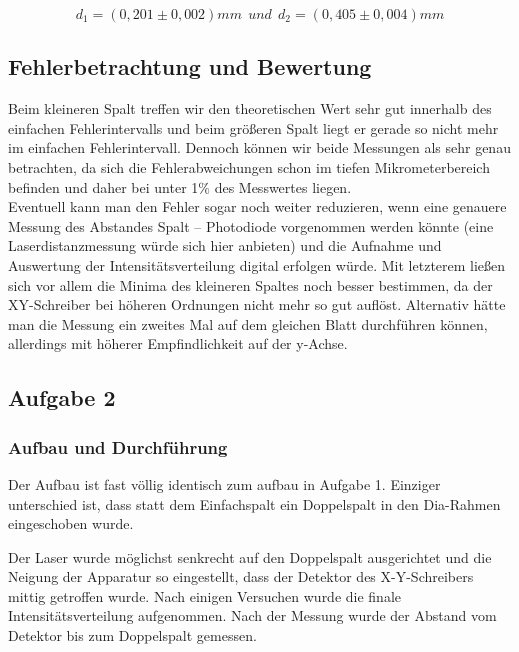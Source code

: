 \documentclass{article}
\begin{document}
\begin{center}
\begin{equation}
d_{1}= (0,201 \pm 0,002)mm \ \ und \ \ d_{2}= (0,405 \pm 0,004)mm
\end{equation}
\end{center}

\subsection{Fehlerbetrachtung und Bewertung}

Beim kleineren Spalt treffen wir den theoretischen Wert sehr gut innerhalb des einfachen Fehlerintervalls und beim größeren Spalt liegt er gerade so nicht mehr im einfachen Fehlerintervall. Dennoch können wir beide Messungen als sehr genau betrachten, da sich die Fehlerabweichungen schon im tiefen Mikrometerbereich befinden und daher bei unter 1\(\% \) des Messwertes liegen.\\
Eventuell kann man den Fehler sogar noch weiter reduzieren, wenn eine genauere Messung des Abstandes Spalt – Photodiode vorgenommen werden könnte  (eine Laserdistanzmessung würde sich hier anbieten) und die Aufnahme und Auswertung der Intensitätsverteilung digital erfolgen würde. Mit letzterem ließen sich vor allem die Minima des kleineren Spaltes noch besser bestimmen, da der XY-Schreiber bei höheren Ordnungen nicht mehr so gut auflöst. Alternativ hätte man die Messung ein zweites Mal auf dem gleichen Blatt durchführen können, allerdings mit höherer Empfindlichkeit auf der y-Achse.

\vspace{1,5cm}

\subsection{Aufgabe 2}

\subsubsection{Aufbau und Durchführung}

Der Aufbau ist fast völlig identisch zum aufbau in Aufgabe 1. Einziger unterschied ist, dass statt dem Einfachspalt ein Doppelspalt in den Dia-Rahmen eingeschoben wurde.

Der Laser wurde möglichst senkrecht auf den Doppelspalt ausgerichtet und die Neigung der Apparatur so eingestellt, dass der Detektor des X-Y-Schreibers mittig getroffen wurde. Nach einigen Versuchen wurde die finale Intensitätsverteilung aufgenommen. Nach der Messung wurde der Abstand vom Detektor bis zum Doppelspalt gemessen.
\end{document}
